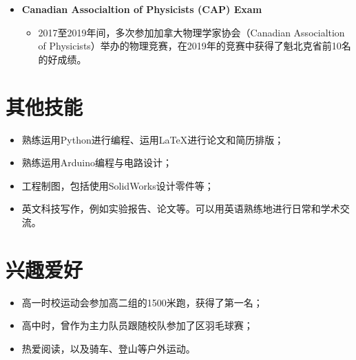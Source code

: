 \documentclass{article}
\begin{document}
\begin{itemize}
  \item \textbf{Canadian Associaltion of Physicists (CAP) Exam}
  \begin{itemize}
    \item 2017至2019年间，多次参加加拿大物理学家协会（Canadian Associaltion of Physicists）举办的物理竞赛，在2019年的竞赛中获得了魁北克省前10名的好成绩。
  \end{itemize}

\end{itemize}

\section{其他技能}
\indent

\begin{itemize}
  \item 熟练运用Python进行编程、运用LaTeX进行论文和简历排版；
  \item 熟练运用Arduino编程与电路设计；
  \item 工程制图，包括使用SolidWorks设计零件等；
  \item 英文科技写作，例如实验报告、论文等。可以用英语熟练地进行日常和学术交流。
\end{itemize}

\section{兴趣爱好}
\indent
\begin{itemize}
  \item 高一时校运动会参加高二组的1500米跑，获得了第一名；
  \item 高中时，曾作为主力队员跟随校队参加了区羽毛球赛；
  \item 热爱阅读，以及骑车、登山等户外运动。
\end{itemize}
\end{document}
